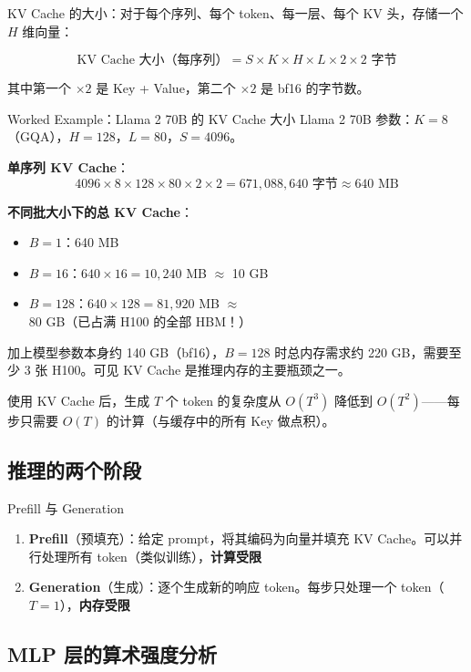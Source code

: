 \documentclass[a4paper]{article}
\begin{document}
KV Cache 的大小：对于每个序列、每个 token、每一层、每个 KV 头，存储一个 $H$ 维向量：

$$\text{KV Cache 大小（每序列）} = S \times K \times H \times L \times 2 \times 2 \text{ 字节}$$

其中第一个 $\times 2$ 是 Key + Value，第二个 $\times 2$ 是 bf16 的字节数。

\begin{knowledgebox}{Worked Example：Llama 2 70B 的 KV Cache 大小}
Llama 2 70B 参数：$K=8$（GQA），$H=128$，$L=80$，$S=4096$。

\textbf{单序列 KV Cache}：
$$4096 \times 8 \times 128 \times 80 \times 2 \times 2 = 671{,}088{,}640 \text{ 字节} \approx 640 \text{ MB}$$

\textbf{不同批大小下的总 KV Cache}：
\begin{itemize}
    \item $B=1$：640 MB
    \item $B=16$：$640 \times 16 = 10{,}240$ MB $\approx$ 10 GB
    \item $B=128$：$640 \times 128 = 81{,}920$ MB $\approx$ 80 GB（已占满 H100 的全部 HBM！）
\end{itemize}

加上模型参数本身约 140 GB（bf16），$B=128$ 时总内存需求约 220 GB，需要至少 3 张 H100。可见 KV Cache 是推理内存的主要瓶颈之一。
\end{knowledgebox}

使用 KV Cache 后，生成 $T$ 个 token 的复杂度从 $O(T^3)$ 降低到 $O(T^2)$——每步只需要 $O(T)$ 的计算（与缓存中的所有 Key 做点积）。

\subsection{推理的两个阶段}

\begin{importantbox}{Prefill 与 Generation}
\begin{enumerate}
    \item \textbf{Prefill}（预填充）：给定 prompt，将其编码为向量并填充 KV Cache。可以并行处理所有 token（类似训练），\textbf{计算受限}
    \item \textbf{Generation}（生成）：逐个生成新的响应 token。每步只处理一个 token（$T=1$），\textbf{内存受限}
\end{enumerate}
\end{importantbox}

\subsection{MLP 层的算术强度分析}
\end{document}
